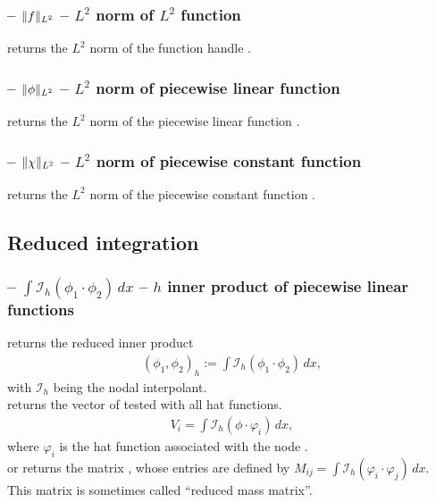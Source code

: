 \documentclass[twoside,11pt,a4paper]{article} %
\begin{document}
\subsubsection*{\texorpdfstring{ -- $\lVert f\rVert_{L^2}$ --}{} \texorpdfstring{$L^2$}{L2} norm of \texorpdfstring{$L^2$}{square integrable} function }
 returns the $L^2$ norm of the function handle .
\subsubsection*{\texorpdfstring{ -- $\lVert\phi\rVert_{L^2}$ --}{} \texorpdfstring{$L^2$}{L2} norm of piecewise linear function }
 returns the $L^2$ norm of the piecewise linear function .
\subsubsection*{\texorpdfstring{ -- $\lVert\chi\rVert_{L^2}$ --}{} \texorpdfstring{$L^2$}{L2} norm of piecewise constant function }
 returns the $L^2$ norm of the piecewise constant function .
\subsection{Reduced integration}
\subsubsection*{\texorpdfstring{ -- $\int \mathcal{I}_h(\phi_1 \cdot \phi_2) \,dx$ --}{} \texorpdfstring{$h$}{Reduced} inner product of piecewise linear functions}
 returns the reduced inner product
\begin{align*}
(\phi_1, \phi_2)_h := \int \mathcal{I}_h(\phi_1 \cdot \phi_2) \,dx,
\end{align*}
with $\mathcal{I}_h$ being the nodal interpolant. \\
 returns the vector  of  tested with all hat functions.
\begin{align*}
 V_i = \int \mathcal{I}_h(\phi \cdot \varphi_i) \,dx,
\end{align*}
where $\varphi_i$ is the hat function associated with the node . \\
 or  returns the matrix , whose entries are defined by $M_{ij} = \int \mathcal{I}_h(\varphi_i \cdot \varphi_j) \,dx$.
This matrix is sometimes called \enquote{reduced mass matrix}.
\end{document}
